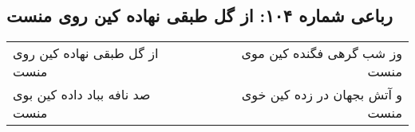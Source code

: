 \begin{center}
\section*{رباعی شماره ۱۰۴: از گل طبقی نهاده کین روی منست}
\label{sec:sh104}
\begin{longtable}{l p{0.5cm} r}
از گل طبقی نهاده کین روی منست
&&
وز شب گرهی فگنده کین موی منست
\\
صد نافه بباد داده کین بوی منست
&&
و آتش بجهان در زده کین خوی منست
\\
\end{longtable}
\end{center}
